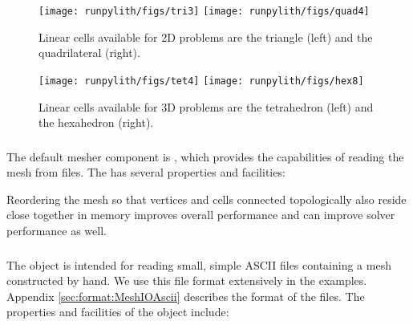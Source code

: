 \begin{figure}[htbp]
  \texttt{[image: runpylith/figs/tri3]}\hspace*{0.5in}%
  \texttt{[image: runpylith/figs/quad4]}
  \caption{Linear cells available for 2D problems are the triangle
    (left) and the quadrilateral (right).}
  \label{fig:2D:cells}
\end{figure}

\begin{figure}[htbp]
  \texttt{[image: runpylith/figs/tet4]}\hspace*{0.5in}%
  \texttt{[image: runpylith/figs/hex8]}
  \caption{Linear cells available for 3D problems are the tetrahedron (left)
    and the hexahedron (right).}
  \label{fig:3D:cells}
\end{figure}

\subsubsection{}

The default mesher component is , which provides
the capabilities of reading the mesh from files. The  has
several properties and facilities:
\begin{inventory}
\end{inventory}
Reordering the mesh so that vertices and cells connected topologically
also reside close together in memory improves overall performance
and can improve solver performance as well.


\subsubsection{}

The  object is intended for reading small, simple
ASCII files containing a mesh constructed by hand. We use this file
format extensively in the examples. Appendix \vref{sec:format:MeshIOAscii}
describes the format of the files. The properties and facilities of
the  object include:
\begin{inventory}
\end{inventory}

